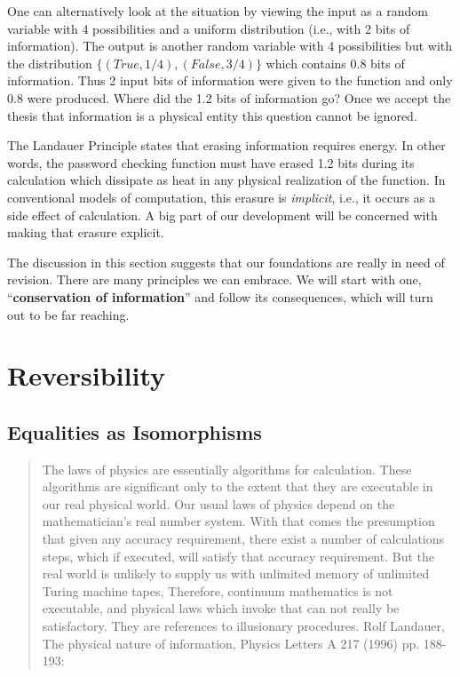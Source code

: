 \documentclass{article}
\begin{document}
One can alternatively look at the situation by viewing the input as a
random variable with 4 possibilities and a uniform distribution (i.e.,
with 2 bits of information). The output is another random variable
with 4 possibilities but with the distribution
$\{ (True, 1/4), (False, 3/4) \}$ which contains 0.8 bits of
information. Thus 2 input bits of information were given to the
function and only 0.8 were produced. Where did the 1.2 bits of
information go? Once we accept the thesis that information is a
physical entity this question cannot be ignored.

The Landauer Principle states that erasing information requires
energy. In other words, the password checking function must have
erased 1.2 bits during its calculation which dissipate as heat in any
physical realization of the function. In conventional models of
computation, this erasure is \emph{implicit}, i.e., it occurs as a
side effect of calculation. A big part of our development will be
concerned with making that erasure explicit.

The discussion in this section suggests that our foundations are really in
need of revision. There are many principles we can embrace.  We will start
with one, ``\textbf{conservation of information}'' and follow its
consequences, which will turn out to be far reaching.

\section{Reversibility}

\subsection{Equalities as Isomorphisms}

\begin{quote}
  The laws of physics are essentially algorithms for calculation. These
  algorithms are significant only to the extent that they are executable in
  our real physical world. Our usual laws of physics depend on the
  mathematician's real number system. With that comes the presumption that
  given any accuracy requirement, there exist a number of calculations steps,
  which if executed, will satisfy that accuracy requirement. But the real
  world is unlikely to supply us with unlimited memory of unlimited Turing
  machine tapes, Therefore, continuum mathematics is not executable, and
  physical laws which invoke that can not really be satisfactory. They are
  references to illusionary procedures. Rolf Landauer, The physical nature of
  information, Physics Letters A 217 (1996) pp. 188-193:
\end{quote} 
\end{document}
